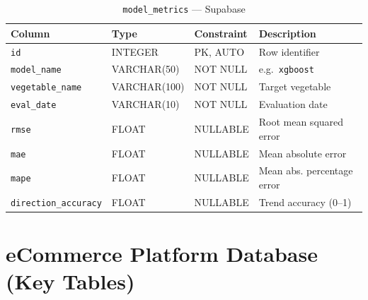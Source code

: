 \documentclass[12pt, a4paper, oneside]{report}
\begin{document}
\begin{table}[H]
\centering
\caption{\texttt{model\_metrics} — Supabase}
\label{tab:model-metrics}
\begin{tabularx}{\textwidth}{@{} L{3.0cm} L{2.2cm} L{2.5cm} X @{}}
\toprule
\textbf{Column} & \textbf{Type} & \textbf{Constraint} & \textbf{Description} \\
\midrule
\texttt{id}                  & INTEGER     & PK, AUTO & Row identifier \\
\texttt{model\_name}         & VARCHAR(50) & NOT NULL & e.g.\ \texttt{xgboost} \\
\texttt{vegetable\_name}     & VARCHAR(100)& NOT NULL & Target vegetable \\
\texttt{eval\_date}          & VARCHAR(10) & NOT NULL & Evaluation date \\
\texttt{rmse}                & FLOAT       & NULLABLE & Root mean squared error \\
\texttt{mae}                 & FLOAT       & NULLABLE & Mean absolute error \\
\texttt{mape}                & FLOAT       & NULLABLE & Mean abs. percentage error \\
\texttt{direction\_accuracy} & FLOAT       & NULLABLE & Trend accuracy (0--1) \\
\bottomrule
\end{tabularx}
\end{table}

\section{eCommerce Platform Database (Key Tables)}
\end{document}
